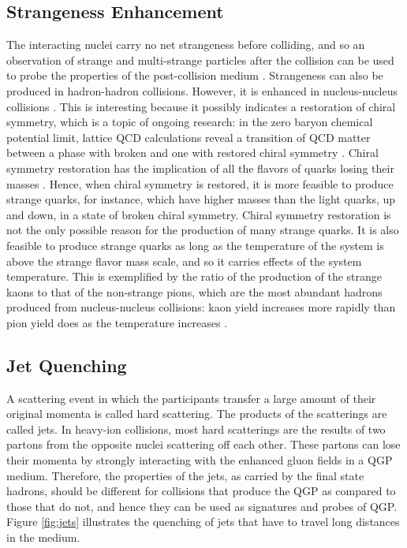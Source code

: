 \subsection{Strangeness Enhancement}
The interacting nuclei carry no net strangeness before colliding, and so an observation of strange and multi-strange particles after the collision can be used to probe the properties of the post-collision medium \cite{1742-6596-455-1-012005}. Strangeness can also be produced in hadron-hadron collisions. However, it is enhanced in nucleus-nucleus collisions \cite{Behera:2012eq}. This is interesting because it possibly indicates a restoration of chiral symmetry, which is a topic of ongoing research: in the zero baryon chemical potential limit, lattice QCD calculations reveal a transition of QCD matter between a phase with broken and one with restored chiral symmetry \cite{ refId0}. Chiral symmetry restoration has the implication of all the flavors of quarks losing their masses \cite{Sazdjian:2016hrz}. Hence, when chiral symmetry is restored, it is more feasible to produce strange quarks, for instance, which have higher masses than the light quarks, up and down, in a state of broken chiral symmetry. Chiral symmetry restoration is not the only possible reason for the production of many strange quarks. It is also feasible to produce strange quarks as long as the temperature of the system is above the strange flavor mass scale, and so it carries effects of the system temperature. This is exemplified by the ratio of the production of the strange kaons to that of the non-strange pions, which are the most abundant hadrons produced from nucleus-nucleus collisions: kaon yield increases more rapidly than pion yield does as the temperature increases \cite{wong1994introduction}.%


\subsection{Jet Quenching}
A scattering event in which the participants transfer a large amount of their original momenta is called hard scattering. The products of the scatterings are called jets. %
In heavy-ion collisions, most hard scatterings are the results of two partons from the opposite nuclei scattering off each other. These partons can lose their momenta by strongly interacting with the enhanced gluon fields in a QGP medium. Therefore, the properties of the jets, as carried by the final state hadrons, should be different for collisions that produce the QGP as compared to those that do not, and hence they can be used as signatures and probes of QGP. Figure \ref{fig:jets} illustrates the quenching of jets that have to travel long distances in the medium.

